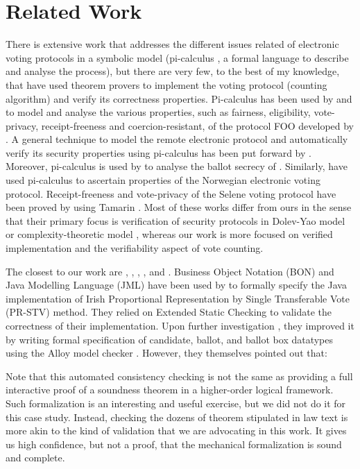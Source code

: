 \section{Related Work}
 There is extensive work that 
 addresses the different issues related of electronic voting protocols  in a symbolic model (pi-calculus  
 \citep{10.5555/329902} \citep{10.1145/373243.360213}, 
 a formal language to describe and analyse the process), 
 but there are very few, to the best of my knowledge, 
 that have used theorem provers to implement the voting protocol (counting algorithm)
 and verify its correctness properties.  Pi-calculus
 has been used by \citep{10.1007/978-3-540-31987-0_14} and  \citep{Delaune2010} 
 to model and analyse the various properties, such as fairness, eligibility, vote-privacy, receipt-freeness and 
 coercion-resistant,  of the protocol FOO developed by \citep{10.1007/3-540-57220-1_66}. 
 A general technique to model the remote electronic protocol 
 and automatically verify  its security properties using pi-calculus has been 
 put forward by \citep{Backes:2008:AVR:1380848.1381255}. Moreover, 
 pi-calculus is used by \citep{5992139} to analyse the ballot secrecy of \citep{Helios:2016:HVS}. 
 Similarly, \citep{10.1007/978-3-642-28641-4_7} have used pi-calculus to ascertain properties of 
 the Norwegian electronic voting protocol. 
 Receipt-freeness and vote-privacy of the Selene voting protocol \citep{Selene} have been 
 proved by \citep{10.1007/978-3-319-68687-5_7}  using Tamarin \citep{10.5555/2958031.2958047}.
 Most of these works differ from ours
 in the sense that their primary focus is verification of security protocols in  
 Dolev-Yao model or  complexity-theoretic model \citep{1056650}, whereas our work is 
 more focused on verified implementation and  the verifiability  aspect of vote counting.

 The closest to our work are \citep{Cochran:2010:VFS} \citep{DeYoung:2012:LLV}, \citep{Pattinson:2015:VCM}, \citep{Pattinson:2016:MSP},
 \citep{Verity:2017:FVI:3014812.3014845}, and \citep{Ghale:2017:FVS}.
 Business Object Notation (BON) and Java Modelling Language (JML)  have been used by \citep{Cochran:2010:VFS} to formally specify the
 Java implementation of  Irish Proportional  Representation  by  Single  Transferable  Vote  (PR-STV) 
 method.  They relied on Extended Static Checking to validate the correctness of their 
 implementation. Upon further investigation \citep{Cochran:2013:FMB}, they improved it 
 by writing formal specification of  candidate, ballot, and ballot box datatypes 
 using the Alloy model checker \citep{10.1145/505145.505149}. However, they themselves pointed out that:
 \begin{displayquote}
 Note that this automated consistency checking is not the same as providing a 
 full interactive proof of a soundness theorem in a higher-order logical framework.
 Such formalization is an interesting and useful exercise, but we did not do it for this 
 case study. Instead, checking the dozens of theorem stipulated in law text is more 
 akin to the kind of validation that we are advocating in this work. 
 It gives us high confidence, but not a proof, that the mechanical formalization is
  sound and complete.
  \end{displayquote}
 

